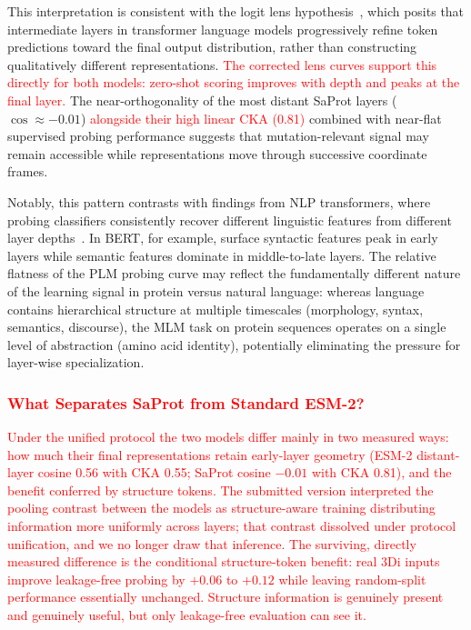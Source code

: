 \documentclass[numbered,webpdf,modern,large]{oup-authoring-template}
\newcommand{\rev}[1]{\textcolor{red}{#1}}
\begin{document}
This interpretation is consistent with the logit lens
hypothesis~\cite{nostalgebraist2020,belrose2023eliciting},
which posits that intermediate layers in transformer language models progressively
refine token predictions toward the final output distribution, rather than
constructing qualitatively different representations. \rev{The corrected lens
curves support this directly for both models: zero-shot scoring improves with depth
and peaks at the final layer.} The near-orthogonality of the most distant SaProt
layers ($\cos \approx -0.01$) \rev{alongside their high linear CKA (0.81)}
combined with near-flat supervised probing
performance suggests that mutation-relevant signal may remain accessible while
representations move through successive coordinate frames.

Notably, this pattern contrasts with findings from NLP transformers, where
probing classifiers consistently recover different linguistic features from
different layer depths~\cite{tenney2019bert,rogers2021bertology}. In BERT, for example,
surface syntactic features peak in early layers while semantic features dominate
in middle-to-late layers. The relative flatness of the PLM probing curve may
reflect the fundamentally different nature of the learning signal in protein
versus natural language: whereas language contains hierarchical structure at
multiple timescales (morphology, syntax, semantics, discourse), the MLM task on
protein sequences operates on a single level of abstraction (amino acid identity),
potentially eliminating the pressure for layer-wise specialization.

\subsubsection{\rev{What Separates SaProt from Standard ESM-2?}}

\rev{Under the unified protocol the two models differ mainly in two measured
ways: how much their final representations retain early-layer geometry (ESM-2
distant-layer cosine 0.56 with CKA 0.55; SaProt cosine $-0.01$ with CKA 0.81), and
the benefit conferred by structure tokens. The submitted version interpreted the
pooling contrast between the models as structure-aware training distributing
information more uniformly across layers; that contrast dissolved under protocol
unification, and we no longer draw that inference. The surviving, directly measured
difference is the conditional structure-token benefit: real 3Di inputs improve
leakage-free probing by $+0.06$ to $+0.12$ while leaving random-split performance
essentially unchanged. Structure information is genuinely present and genuinely
useful, but only leakage-free evaluation can see it.}
\end{document}
